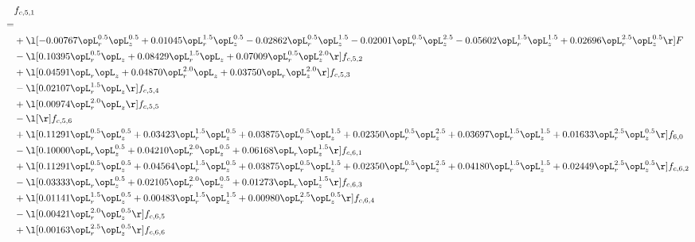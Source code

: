 \begin{alignat}{2} 
\label{eq:f_51_2} 
& f_{c,5,1} \nonumber \\ 
 = \\ 
& + \l[  -0.00767 \opL_r^{0.5} \opL_z^{0.5} +  0.01045 \opL_r^{1.5} \opL_z^{0.5}   -0.02862 \opL_r^{0.5} \opL_z^{1.5}   -0.02001 \opL_r^{0.5} \opL_z^{2.5}   -0.05602 \opL_r^{1.5} \opL_z^{1.5} +  0.02696 \opL_r^{2.5} \opL_z^{0.5}  \r] F \nonumber \\ 
& - \l[  0.10395 \opL_r^{0.5} \opL_z +  0.08429 \opL_r^{1.5} \opL_z +  0.07009 \opL_r^{0.5} \opL_z^{2.0}  \r] f_{c,5,2} \nonumber \\ 
& + \l[  0.04591 \opL_r \opL_z +  0.04870 \opL_r^{2.0} \opL_z +  0.03750 \opL_r \opL_z^{2.0}  \r] f_{c,5,3} \nonumber \\ 
& - \l[  0.02107 \opL_r^{1.5} \opL_z  \r] f_{c,5,4} \nonumber \\ 
& + \l[  0.00974 \opL_r^{2.0} \opL_z  \r] f_{c,5,5} \nonumber \\ 
& - \l[  \r] f_{c,5,6} \nonumber \\ 
& + \l[  0.11291 \opL_r^{0.5} \opL_z^{0.5} +  0.03423 \opL_r^{1.5} \opL_z^{0.5} +  0.03875 \opL_r^{0.5} \opL_z^{1.5} +  0.02350 \opL_r^{0.5} \opL_z^{2.5} +  0.03697 \opL_r^{1.5} \opL_z^{1.5} +  0.01633 \opL_r^{2.5} \opL_z^{0.5}  \r] f_{6,0} \nonumber \\ 
& - \l[  0.10000 \opL_r \opL_z^{0.5} +  0.04210 \opL_r^{2.0} \opL_z^{0.5} +  0.06168 \opL_r \opL_z^{1.5}  \r] f_{c,6,1} \nonumber \\ 
& + \l[  0.11291 \opL_r^{0.5} \opL_z^{0.5} +  0.04564 \opL_r^{1.5} \opL_z^{0.5} +  0.03875 \opL_r^{0.5} \opL_z^{1.5} +  0.02350 \opL_r^{0.5} \opL_z^{2.5} +  0.04180 \opL_r^{1.5} \opL_z^{1.5} +  0.02449 \opL_r^{2.5} \opL_z^{0.5}  \r] f_{c,6,2} \nonumber \\ 
& - \l[  0.03333 \opL_r \opL_z^{0.5} +  0.02105 \opL_r^{2.0} \opL_z^{0.5} +  0.01273 \opL_r \opL_z^{1.5}  \r] f_{c,6,3} \nonumber \\ 
& + \l[  0.01141 \opL_r^{1.5} \opL_z^{0.5} +  0.00483 \opL_r^{1.5} \opL_z^{1.5} +  0.00980 \opL_r^{2.5} \opL_z^{0.5}  \r] f_{c,6,4} \nonumber \\ 
& - \l[  0.00421 \opL_r^{2.0} \opL_z^{0.5}  \r] f_{c,6,5} \nonumber \\ 
& + \l[  0.00163 \opL_r^{2.5} \opL_z^{0.5}  \r] f_{c,6,6} \nonumber \\ 
\end{alignat} 


